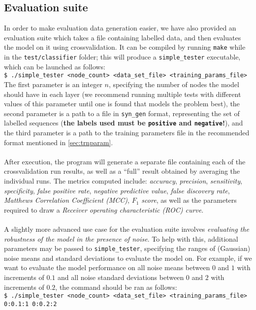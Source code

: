 \documentclass[12pt,openany]{article}
\newcommand{\shellcmd}[1]{\\\indent\indent\texttt{\footnotesize\$ #1}}
\begin{document}
	\subsection{Evaluation suite}
	In order to make evaluation data generation easier, we have also provided an evaluation suite which takes a file containing labelled data, and then evaluates the model on it using crossvalidation. It can be compiled by running {\tt make} while in the {\tt test/classifier} folder; this will produce a {\tt simple\_tester} executable, which can be launched as follows:
	\shellcmd{./simple\_tester <node\_count> <data\_set\_file> <training\_params\_file>}\\
	The first parameter is an integer $n$, specifying the number of nodes the model should have in each layer (we recommend running multiple tests with different values of this parameter until one is found that models the problem best), the second parameter is a path to a file in {\tt syn\_gen} format, representing the set of labelled sequences (\textbf{the labels used must be {\tt positive} and {\tt negative}!}), and the third parameter is a path to the training parameters file in the recommended format mentioned in \cref{sec:trnparam}.\\ \\
	After execution, the program will generate a separate file containing each of the crossvalidation run results, as well as a ``full'' result obtained by averaging the individual runs. The metrics computed include: \emph{accuracy}, \emph{precision}, \emph{sensitivity}, \emph{specificity}, \emph{false positive rate}, \emph{negative predictive value}, \emph{false discovery rate}, \emph{Matthews Correlation Coefficient (MCC)}, \emph{$F_1$ score}, as well as the parameters required to draw a \emph{Receiver operating characteristic (ROC) curve}.\\ \\
	A slightly more advanced use case for the evaluation suite involves \emph{evaluating the robustness of the model in the presence of noise}. To help with this, additional parameters may be passed to {\tt simple\_tester}, specifying the ranges of (Gaussian) noise means and standard deviations to evaluate the model on. For example, if we want to evaluate the model performance on all noise means between $0$ and $1$ with increments of $0.1$ and all noise standard deviations between $0$ and $2$ with increments of $0.2$, the command should be ran as follows:
	\shellcmd{./simple\_tester <node\_count> <data\_set\_file> <training\_params\_file> 0:0.1:1 0:0.2:2}
\end{document}
